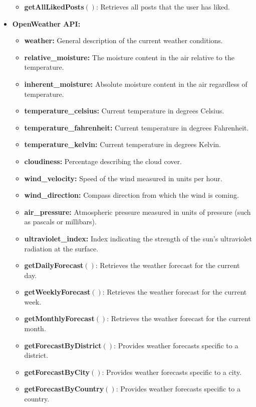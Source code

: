 \begin{itemize}
\begin{itemize}
            \item \textbf{getAllLikedPosts}$()$: Retrieves all posts that the user has liked.
        \end{itemize}
    \item \textbf{OpenWeather API:}
        \begin{itemize}
            \item \textbf{weather:} General description of the current weather conditions.
            \item \textbf{relative\_moisture:} The moisture content in the air relative to the temperature.
            \item \textbf{inherent\_moisture:} Absolute moisture content in the air regardless of temperature.
            \item \textbf{temperature\_celsius:} Current temperature in degrees Celsius.
            \item \textbf{temperature\_fahrenheit:} Current temperature in degrees Fahrenheit.
            \item \textbf{temperature\_kelvin:} Current temperature in degrees Kelvin.
            \item \textbf{cloudiness:} Percentage describing the cloud cover.
            \item \textbf{wind\_velocity:} Speed of the wind measured in units per hour.
            \item \textbf{wind\_direction:} Compass direction from which the wind is coming.
            \item \textbf{air\_pressure:} Atmospheric pressure measured in units of pressure (such as pascals or millibars).
            \item \textbf{ultraviolet\_index:} Index indicating the strength of the sun’s ultraviolet radiation at the surface.
            \item \textbf{getDailyForecast}$()$: Retrieves the weather forecast for the current day.
            \item \textbf{getWeeklyForecast}$()$: Retrieves the weather forecast for the current week.
            \item \textbf{getMonthlyForecast}$()$: Retrieves the weather forecast for the current month.
            \item \textbf{getForecastByDistrict}$()$: Provides weather forecasts specific to a district.
            \item \textbf{getForecastByCity}$()$: Provides weather forecasts specific to a city.
            \item \textbf{getForecastByCountry}$()$: Provides weather forecasts specific to a country.
        \end{itemize}
\end{itemize}
